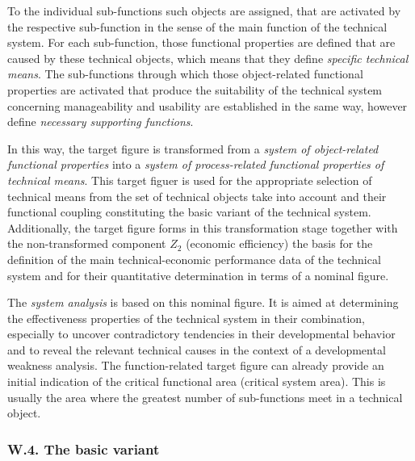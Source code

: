 \documentclass[11pt,a4paper]{article}
\begin{document}
To the individual sub-functions such objects are assigned, that are activated
by the respective sub-function in the sense of the main function of the
technical system. For each sub-function, those functional properties are
defined that are caused by these technical objects, which means that they
define \emph{specific technical means}. The sub-functions through which those
object-related functional properties are activated that produce the
suitability of the technical system concerning manageability and usability are
established in the same way, however define \emph{necessary supporting
  functions}.

In this way, the target figure is transformed from a \emph{system of
  object-related functional properties} into a \emph{system of process-related
  functional properties of technical means}. This target figuer is used for
the appropriate selection of technical means from the set of technical objects
take into account and their functional coupling constituting the basic variant
of the technical system. Additionally, the target figure forms in this
transformation stage together with the non-transformed component $Z_2$
(economic efficiency) the basis for the definition of the main
technical-economic performance data of the technical system and for their
quantitative determination in terms of a nominal figure.

The \emph{system analysis} is based on this nominal figure. It is aimed at
determining the effectiveness properties of the technical system in their
combination, especially to uncover contradictory tendencies in their
developmental behavior and to reveal the relevant technical causes in the
context of a developmental weakness analysis. The function-related target
figure can already provide an initial indication of the critical functional
area (critical system area). This is usually the area where the greatest
number of sub-functions meet in a technical object.

\subsubsection*{W.4. The basic variant}
\end{document}
